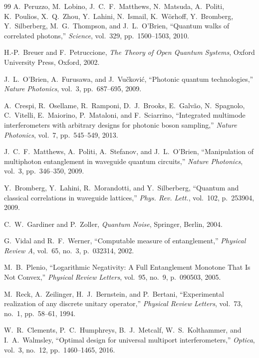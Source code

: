 \begin{thebibliography}{99}
	A.~Peruzzo, M.~Lobino, J.~C.~F.~Matthews, N.~Matsuda, A.~Politi,
	K.~Poulios, X.~Q.~Zhou, Y.~Lahini, N.~Ismail, K.~W{\"o}rhoff,
	Y.~Bromberg, Y.~Silberberg, M.~G.~Thompson, and J.~L.~O'Brien,
	``Quantum walks of correlated photons,''
	\textit{Science}, vol.~329, pp.~1500--1503, 2010.
	
	H.-P.~Breuer and F.~Petruccione,
	\textit{The Theory of Open Quantum Systems},
	Oxford University Press, Oxford, 2002.

	J.~L.~O'Brien, A.~Furusawa, and J.~Vu\v{c}kovi\'c,
	``Photonic quantum technologies,''
	\textit{Nature Photonics}, vol.~3, pp.~687--695, 2009.
	
	A.~Crespi, R.~Osellame, R.~Ramponi, D.~J.~Brooks, E.~Galv{\~a}o,
	N.~Spagnolo, C.~Vitelli, E.~Maiorino, P.~Mataloni, and F.~Sciarrino,
	``Integrated multimode interferometers with arbitrary designs for photonic boson sampling,''
	\textit{Nature Photonics}, vol.~7, pp.~545--549, 2013.
	
	J.~C.~F.~Matthews, A.~Politi, A.~Stefanov, and J.~L.~O'Brien,
	``Manipulation of multiphoton entanglement in waveguide quantum circuits,''
	\textit{Nature Photonics}, vol.~3, pp.~346--350, 2009.
	
	Y.~Bromberg, Y.~Lahini, R.~Morandotti, and Y.~Silberberg,
	``Quantum and classical correlations in waveguide lattices,''
	\textit{Phys. Rev. Lett.}, vol.~102, p.~253904, 2009.
	
	C.~W.~Gardiner and P.~Zoller,
	\textit{Quantum Noise},
	Springer, Berlin, 2004.
	
	G.~Vidal and R.~F.~Werner,
	``Computable measure of entanglement,''
	\textit{Physical Review A},
	vol.~65, no.~3, p.~032314, 2002.
	
	M.~B.~Plenio,
	``Logarithmic Negativity: A Full Entanglement Monotone That Is Not Convex,''
	\textit{Physical Review Letters},
	vol.~95, no.~9, p.~090503, 2005.
	
	M.~Reck, A.~Zeilinger, H.~J.~Bernstein, and P.~Bertani,
	``Experimental realization of any discrete unitary operator,''
	\textit{Physical Review Letters},
	vol.~73, no.~1, pp.~58--61, 1994.
	
	W.~R.~Clements, P.~C.~Humphreys, B.~J.~Metcalf, W.~S.~Kolthammer, and I.~A.~Walmsley,
	``Optimal design for universal multiport interferometers,''
	\textit{Optica},
	vol.~3, no.~12, pp.~1460--1465, 2016.
	

\end{thebibliography}
